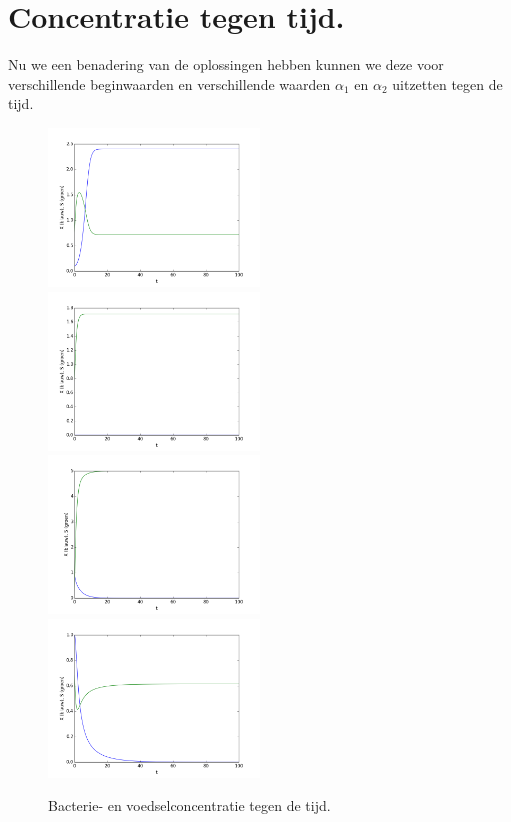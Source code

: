\section{Concentratie tegen tijd.}
Nu we een benadering van de oplossingen hebben kunnen we deze voor verschillende beginwaarden en verschillende waarden $\alpha_1$ en $\alpha_2$ uitzetten tegen de tijd.
\newpage
\begin{figure}[h]
    \includegraphics[width=0.5\textwidth]{../images/figure_1.png}
    \includegraphics[width=0.5\textwidth]{../images/figure_2.png}
    \includegraphics[width=0.5\textwidth]{../images/figure_3.png}
    \includegraphics[width=0.5\textwidth]{../images/figure_4.png}
    \caption{Bacterie- en voedselconcentratie tegen de tijd.}
    \label{fig:tijd_plots}
\end{figure}

